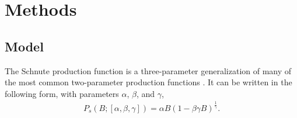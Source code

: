 
\section{Methods \label{meth}}


%
\subsection{Model\label{sModel}}

%
The Schnute production function is a three-parameter generalization of many of
the most common two-parameter production functions \cite{deriso_harvesting_1980, schnute_general_1985}. %
It can be written in the following form, with parameters $\alpha$, $\beta$, and $\gamma$,
%
\begin{align}
P_s(B; [\alpha, \beta, \gamma]) = \alpha B (1-\beta\gamma B)^{\frac{1}{\gamma}}.
\end{align}

